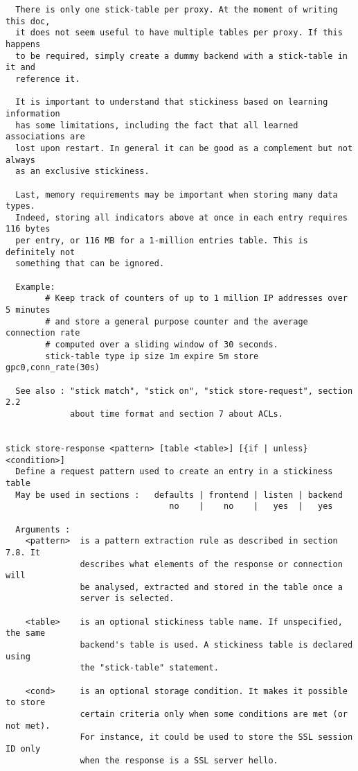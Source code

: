 \begin{verbatim}
  There is only one stick-table per proxy. At the moment of writing this doc,
  it does not seem useful to have multiple tables per proxy. If this happens
  to be required, simply create a dummy backend with a stick-table in it and
  reference it.

  It is important to understand that stickiness based on learning information
  has some limitations, including the fact that all learned associations are
  lost upon restart. In general it can be good as a complement but not always
  as an exclusive stickiness.

  Last, memory requirements may be important when storing many data types.
  Indeed, storing all indicators above at once in each entry requires 116 bytes
  per entry, or 116 MB for a 1-million entries table. This is definitely not
  something that can be ignored.

  Example:
        # Keep track of counters of up to 1 million IP addresses over 5 minutes
        # and store a general purpose counter and the average connection rate
        # computed over a sliding window of 30 seconds.
        stick-table type ip size 1m expire 5m store gpc0,conn_rate(30s)

  See also : "stick match", "stick on", "stick store-request", section 2.2
             about time format and section 7 about ACLs.


stick store-response <pattern> [table <table>] [{if | unless} <condition>]
  Define a request pattern used to create an entry in a stickiness table
  May be used in sections :   defaults | frontend | listen | backend
                                 no    |    no    |   yes  |   yes

  Arguments :
    <pattern>  is a pattern extraction rule as described in section 7.8. It
               describes what elements of the response or connection will
               be analysed, extracted and stored in the table once a
               server is selected.

    <table>    is an optional stickiness table name. If unspecified, the same
               backend's table is used. A stickiness table is declared using
               the "stick-table" statement.

    <cond>     is an optional storage condition. It makes it possible to store
               certain criteria only when some conditions are met (or not met).
               For instance, it could be used to store the SSL session ID only
               when the response is a SSL server hello.


\end{verbatim}
